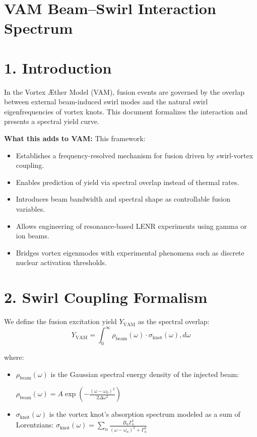 \documentclass[a4paper, aps,preprint,superscriptaddress, 12pt]{revtex4}
\begin{document}
\section{VAM Beam--Swirl Interaction Spectrum}

\section*{1. Introduction}
In the Vortex Æther Model (VAM), fusion events are governed by the overlap between external beam-induced swirl modes and the natural swirl eigenfrequencies of vortex knots. This document formalizes the interaction and presents a spectral yield curve.

\textbf{What this adds to VAM:} This framework:
\begin{itemize}
\item Establishes a frequency-resolved mechanism for fusion driven by swirl-vortex coupling.
\item Enables prediction of yield via spectral overlap instead of thermal rates.
\item Introduces beam bandwidth and spectral shape as controllable fusion variables.
\item Allows engineering of resonance-based LENR experiments using gamma or ion beams.
\item Bridges vortex eigenmodes with experimental phenomena such as discrete nuclear activation thresholds.
\end{itemize}

\section*{2. Swirl Coupling Formalism}
We define the fusion excitation yield $Y_{\mathrm{VAM}}$ as the spectral overlap:
\begin{equation}
Y_{\mathrm{VAM}} = \int_0^\infty \rho_{\mathrm{beam}}(\omega) \cdot \sigma_{\mathrm{knot}}(\omega) , d\omega
\end{equation}

\noindent where:
\begin{itemize}
\item $\rho_{\mathrm{beam}}(\omega)$ is the Gaussian spectral energy density of the injected beam:

$\rho_{\mathrm{beam}}(\omega) = A \exp\left(-\frac{(\omega - \omega_0)^2}{2 \Delta \omega^2} \right)$
\item $\sigma_{\mathrm{knot}}(\omega)$ is the vortex knot's absorption spectrum modeled as a sum of Lorentzians:
$\sigma_{\mathrm{knot}}(\omega) = \sum_n \frac{B_n \Gamma_n^2}{(\omega - \omega_n)^2 + \Gamma_n^2}$
\end{itemize}
\end{document}
